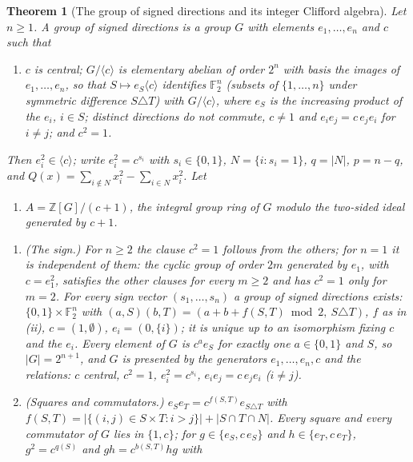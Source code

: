 \documentclass[11pt]{article}
\newtheorem{theorem}{Theorem}[section]
\theoremstyle{definition}
\theoremstyle{plain}
\newcommand{\changedmark}[2]{\marginpar{\raggedright\scriptsize\color{#1}#2}}
\providecommand{\Z}{}\renewcommand{\Z}{\mathbb{Z}}
\begin{document}
\begin{theorem}[The group of signed directions and its integer Clifford algebra]\label{c:synthesis.signed-directions-and-the-integer-clifford-algebra}
\changedmark{BurntOrange}{changed since the deposit}
Let $n \ge 1$. A \emph{group of signed directions} is a group $G$ with elements $e_{1}, \dots, e_{n}$ and $c$ such that
\begin{enumerate}
\item[(F2)] $c$ is central; $G/\langle c\rangle$ is elementary abelian of order $2^{n}$ with basis the images of $e_{1}, \dots, e_{n}$, so that $S \mapsto e_{S}\langle c\rangle$ identifies $\mathbb{F}_{2}^{n}$ (subsets of $\{1, \dots, n\}$ under symmetric difference $S \triangle T$) with $G/\langle c\rangle$, where $e_{S}$ is the increasing product of the $e_{i}$, $i \in S$; distinct directions do not commute, $c \ne 1$ and $e_{i}e_{j} = c\,e_{j}e_{i}$ for $i \ne j$; and $c^{2} = 1$.
\end{enumerate}
Then $e_{i}^{2} \in \langle c\rangle$; write $e_{i}^{2} = c^{s_{i}}$ with $s_{i} \in \{0, 1\}$, $N = \{i : s_{i} = 1\}$, $q = |N|$, $p = n - q$, and $Q(x) = \sum_{i \notin N} x_{i}^{2} - \sum_{i \in N} x_{i}^{2}$. Let
\begin{enumerate}
\item[(F3)] $A = \Z[G]/(c + 1)$, the integral group ring of $G$ modulo the two-sided ideal generated by $c + 1$.
\end{enumerate}
\begin{enumerate}
\item[(i)] \emph{(The sign.)} For $n \ge 2$ the clause $c^{2} = 1$ follows from the others; for $n = 1$ it is independent of them: the cyclic group of order $2m$ generated by $e_{1}$, with $c = e_{1}^{2}$, satisfies the other clauses for every $m \ge 2$ and has $c^{2} = 1$ only for $m = 2$. For every sign vector $(s_{1}, \dots, s_{n})$ a group of signed directions exists: $\{0, 1\} \times \mathbb{F}_{2}^{n}$ with $(a, S)(b, T) = (a + b + f(S,T) \bmod 2,\ S \triangle T)$, $f$ as in (ii), $c = (1, \emptyset)$, $e_{i} = (0, \{i\})$; it is unique up to an isomorphism fixing $c$ and the $e_{i}$. Every element of $G$ is $c^{a}e_{S}$ for exactly one $a \in \{0, 1\}$ and $S$, so $|G| = 2^{n+1}$, and $G$ is presented by the generators $e_{1}, \dots, e_{n}, c$ and the relations: $c$ central, $c^{2} = 1$, $e_{i}^{2} = c^{s_{i}}$, $e_{i}e_{j} = c\,e_{j}e_{i}$ ($i \ne j$).
\item[(ii)] \emph{(Squares and commutators.)} $e_{S}e_{T} = c^{f(S,T)}e_{S \triangle T}$ with $f(S,T) = |\{(i, j) \in S \times T : i > j\}| + |S \cap T \cap N|$. Every square and every commutator of $G$ lies in $\{1, c\}$; for $g \in \{e_{S}, c\,e_{S}\}$ and $h \in \{e_{T}, c\,e_{T}\}$, $g^{2} = c^{q(S)}$ and $gh = c^{b(S,T)}hg$ with

\end{enumerate}
\end{theorem}
\end{document}
